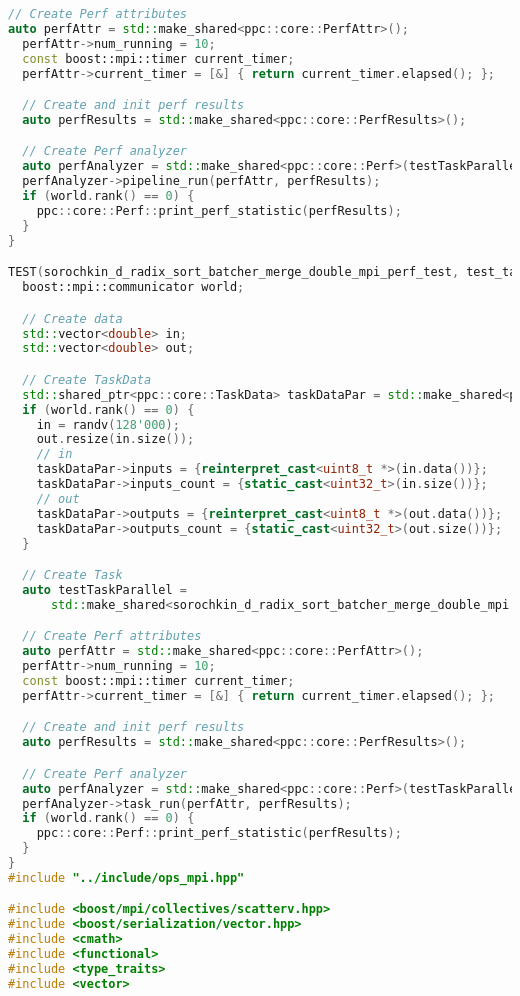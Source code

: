 \documentclass[12pt]{article}
\begin{document}
\begin{lstlisting}[language=C++, caption={Код алгоритма}]
  // Create Perf attributes
auto perfAttr = std::make_shared<ppc::core::PerfAttr>();
  perfAttr->num_running = 10;
  const boost::mpi::timer current_timer;
  perfAttr->current_timer = [&] { return current_timer.elapsed(); };

  // Create and init perf results
  auto perfResults = std::make_shared<ppc::core::PerfResults>();

  // Create Perf analyzer
  auto perfAnalyzer = std::make_shared<ppc::core::Perf>(testTaskParallel);
  perfAnalyzer->pipeline_run(perfAttr, perfResults);
  if (world.rank() == 0) {
    ppc::core::Perf::print_perf_statistic(perfResults);
  }
}

TEST(sorochkin_d_radix_sort_batcher_merge_double_mpi_perf_test, test_task_run) {
  boost::mpi::communicator world;

  // Create data
  std::vector<double> in;
  std::vector<double> out;

  // Create TaskData
  std::shared_ptr<ppc::core::TaskData> taskDataPar = std::make_shared<ppc::core::TaskData>();
  if (world.rank() == 0) {
    in = randv(128'000);
    out.resize(in.size());
    // in
    taskDataPar->inputs = {reinterpret_cast<uint8_t *>(in.data())};
    taskDataPar->inputs_count = {static_cast<uint32_t>(in.size())};
    // out
    taskDataPar->outputs = {reinterpret_cast<uint8_t *>(out.data())};
    taskDataPar->outputs_count = {static_cast<uint32_t>(out.size())};
  }

  // Create Task
  auto testTaskParallel =
      std::make_shared<sorochkin_d_radix_sort_batcher_merge_double_mpi::TestMPITaskParallel>(taskDataPar);

  // Create Perf attributes
  auto perfAttr = std::make_shared<ppc::core::PerfAttr>();
  perfAttr->num_running = 10;
  const boost::mpi::timer current_timer;
  perfAttr->current_timer = [&] { return current_timer.elapsed(); };

  // Create and init perf results
  auto perfResults = std::make_shared<ppc::core::PerfResults>();

  // Create Perf analyzer
  auto perfAnalyzer = std::make_shared<ppc::core::Perf>(testTaskParallel);
  perfAnalyzer->task_run(perfAttr, perfResults);
  if (world.rank() == 0) {
    ppc::core::Perf::print_perf_statistic(perfResults);
  }
}
#include "../include/ops_mpi.hpp"

#include <boost/mpi/collectives/scatterv.hpp>
#include <boost/serialization/vector.hpp>
#include <cmath>
#include <functional>
#include <type_traits>
#include <vector>


\end{lstlisting}
\end{document}
